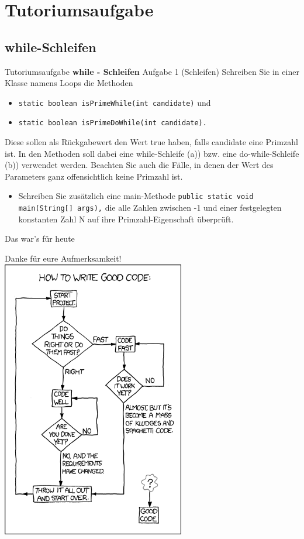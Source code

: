 \documentclass[18pt]{beamer}
\begin{document}
\section{Tutoriumsaufgabe}
\subsection{while-Schleifen}

\begin{frame}[fragile]{Tutoriumsaufgabe}
\textbf{while - Schleifen}
Aufgabe 1 (Schleifen)
Schreiben Sie in einer Klasse namens Loops die Methoden
\begin{itemize}
\item \lstinline{static boolean isPrimeWhile(int candidate)} und
\item \lstinline$static boolean isPrimeDoWhile(int candidate).$
\end{itemize}
\small{Diese sollen als Rückgabewert den Wert true haben, falls candidate eine Primzahl ist. In den
Methoden soll dabei eine while-Schleife (a)) bzw. eine do-while-Schleife (b))
verwendet werden. Beachten Sie auch die Fälle, in denen der Wert des Parameters ganz offensichtlich
keine Primzahl ist.}
\begin{itemize}
\item Schreiben Sie zusätzlich eine main-Methode
\lstinline$public static void main(String[] args),$
die alle Zahlen zwischen -1 und einer festgelegten konstanten Zahl N auf ihre Primzahl-Eigenschaft
überprüft.
\end{itemize}
\end{frame}

\begin{frame}[fragile]{Das war's für heute}
\begin{center}
Danke für eure Aufmerksamkeit!\newline
\includegraphics[width=0.6\textwidth, height= 0.8\textheight]{good_code.png}
\end{center}
\end{frame}



\appendix
\beginbackup


\backupend
\end{document}
